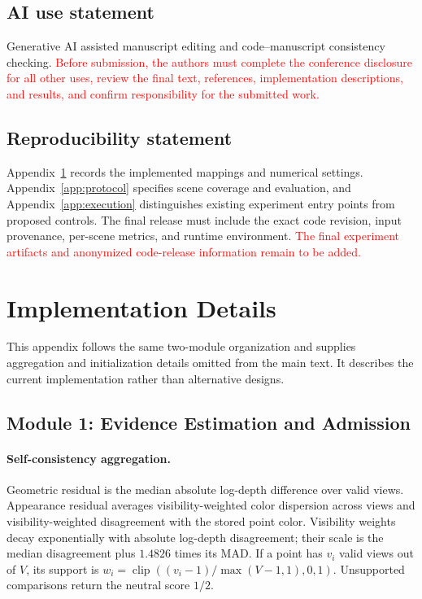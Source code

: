 \documentclass{article}
\newcommand{\PH}[1]{\textcolor{red}{#1}}
\DeclareMathOperator{\clip}{clip}
\begin{document}
\subsection*{AI use statement}
Generative AI assisted manuscript editing and code--manuscript consistency checking.
\PH{Before submission, the authors must complete the conference disclosure for all other uses, review the final text, references, implementation descriptions, and results, and confirm responsibility for the submitted work.}

\subsection*{Reproducibility statement}
Appendix~\ref{app:details} records the implemented mappings and numerical settings. Appendix~\ref{app:protocol} specifies scene coverage and evaluation, and Appendix~\ref{app:execution} distinguishes existing experiment entry points from proposed controls. The final release must include the exact code revision, input provenance, per-scene metrics, and runtime environment. \PH{The final experiment artifacts and anonymized code-release information remain to be added.}




\clearpage
\appendix
\section{Implementation Details}
\label{app:details}

This appendix follows the same two-module organization and supplies aggregation and initialization details omitted from the main text. It describes the current implementation rather than alternative designs.

\subsection{Module 1: Evidence Estimation and Admission}
\label{app:admission}

\paragraph{Self-consistency aggregation.}
Geometric residual is the median absolute log-depth difference over valid views. Appearance residual averages visibility-weighted color dispersion across views and visibility-weighted disagreement with the stored point color. Visibility weights decay exponentially with absolute log-depth disagreement; their scale is the median disagreement plus $1.4826$ times its MAD. If a point has $v_i$ valid views out of $V$, its support is $w_i=\clip((v_i-1)/\max(V-1,1),0,1)$. Unsupported comparisons return the neutral score $1/2$.
\end{document}
